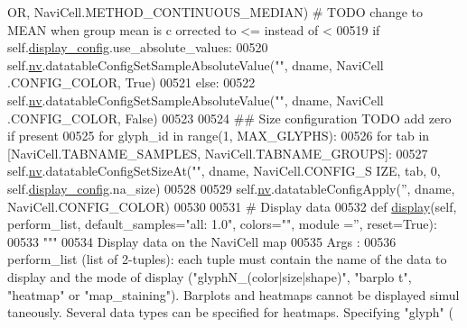 \begin{DoxyCode}
      OR, NaviCell.METHOD\_CONTINUOUS\_MEDIAN) \textcolor{comment}{# TODO change to MEAN when group mean is c
      orrected to <= instead of <}
00519             \textcolor{keywordflow}{if} self.\hyperlink{classnavicom_1_1navicom_1_1NaviCom_a56628d774db59cb8b06af3801fb6306c}{display_config}.use\_absolute\_values:
00520                 self.\hyperlink{classnavicom_1_1navicom_1_1NaviCom_af740fe52f9f3cfc076ae88ca696bd05e}{nv}.datatableConfigSetSampleAbsoluteValue(\textcolor{stringliteral}{""}, dname, NaviCell
      .CONFIG\_COLOR, \textcolor{keyword}{True})
00521             \textcolor{keywordflow}{else}:
00522                 self.\hyperlink{classnavicom_1_1navicom_1_1NaviCom_af740fe52f9f3cfc076ae88ca696bd05e}{nv}.datatableConfigSetSampleAbsoluteValue(\textcolor{stringliteral}{""}, dname, NaviCell
      .CONFIG\_COLOR, \textcolor{keyword}{False})
00523 
00524             \textcolor{comment}{## Size configuration TODO add zero if present}
00525             \textcolor{keywordflow}{for} glyph\_id \textcolor{keywordflow}{in} range(1, MAX\_GLYPHS):
00526                 \textcolor{keywordflow}{for} tab \textcolor{keywordflow}{in} [NaviCell.TABNAME\_SAMPLES, NaviCell.TABNAME\_GROUPS]:
00527                     self.\hyperlink{classnavicom_1_1navicom_1_1NaviCom_af740fe52f9f3cfc076ae88ca696bd05e}{nv}.datatableConfigSetSizeAt(\textcolor{stringliteral}{""}, dname, NaviCell.CONFIG\_S
      IZE, tab, 0, self.\hyperlink{classnavicom_1_1navicom_1_1NaviCom_a56628d774db59cb8b06af3801fb6306c}{display_config}.na\_size)
00528 
00529             self.\hyperlink{classnavicom_1_1navicom_1_1NaviCom_af740fe52f9f3cfc076ae88ca696bd05e}{nv}.datatableConfigApply(\textcolor{stringliteral}{''}, dname, NaviCell.CONFIG\_COLOR)
00530         
00531     \textcolor{comment}{# Display data}
00532     \textcolor{keyword}{def }\hyperlink{classnavicom_1_1navicom_1_1NaviCom_ad7d4390d700d4a6d2533647887f8ab94}{display}(self, perform\_list, default\_samples="all: 1.0\textcolor{stringliteral}{", colors="}\textcolor{stringliteral}{", module
      ='', reset=True):}
00533 \textcolor{stringliteral}{        }\textcolor{stringliteral}{"""}
00534 \textcolor{stringliteral}{        Display data on the NaviCell map}
00535 \textcolor{stringliteral}{        Args :}
00536 \textcolor{stringliteral}{            perform\_list (list of 2-tuples): each tuple must contain the name of 
      the data to display and the mode of display ("glyphN\_(color|size|shape)", "barplo
      t", "heatmap" or "map\_staining"). Barplots and heatmaps cannot be displayed simul
      taneously. Several data types can be specified for heatmaps. Specifying "glyph" (
}
\end{DoxyCode}
